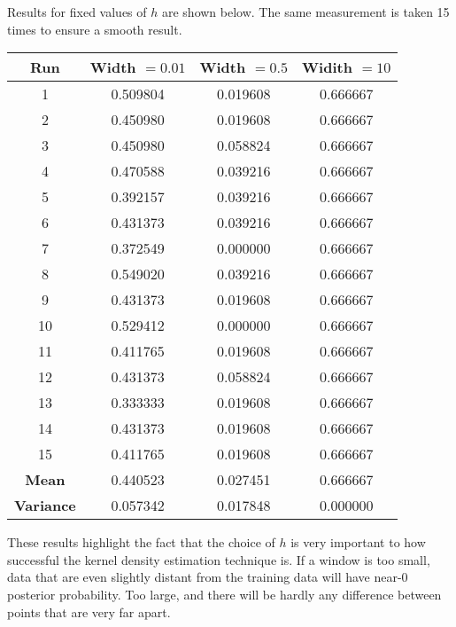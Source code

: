 \documentclass{article}
\begin{document}
Results for fixed values of $h$ are shown below. The same measurement is taken
15 times to ensure a smooth result.

\begin{center}
\begin{tabular}{|c|c|c|c|}
\hline
	{\bf Run} & {\bf Width $= 0.01$} & {\bf Width $=0.5$} & {\bf Widith $=10$} \\
\hline
                   1 & 0.509804 & 0.019608 & 0.666667\\
                   2 & 0.450980 & 0.019608 & 0.666667\\
                   3 & 0.450980 & 0.058824 & 0.666667\\
                   4 & 0.470588 & 0.039216 & 0.666667\\
                   5 & 0.392157 & 0.039216 & 0.666667\\
                   6 & 0.431373 & 0.039216 & 0.666667\\
                   7 & 0.372549 & 0.000000 & 0.666667\\
                   8 & 0.549020 & 0.039216 & 0.666667\\
                   9 & 0.431373 & 0.019608 & 0.666667\\
                  10 & 0.529412 & 0.000000 & 0.666667\\
                  11 & 0.411765 & 0.019608 & 0.666667\\
                  12 & 0.431373 & 0.058824 & 0.666667\\
                  13 & 0.333333 & 0.019608 & 0.666667\\
                  14 & 0.431373 & 0.019608 & 0.666667\\
                  15 & 0.411765 & 0.019608 & 0.666667\\
\hline
	{\bf Mean}  & 0.440523 & 0.027451 & 0.666667 \\
	{\bf Variance} &  0.057342 & 0.017848 & 0.000000 \\
\hline
\end{tabular}
\end{center}

These results highlight the fact that the choice of $h$ is very important to how
successful the kernel density estimation technique is. If a window is too small,
data that are even slightly distant from the training data will have near-0
posterior probability. Too large, and there will be hardly any difference
between points that are very far apart.
\end{document}
